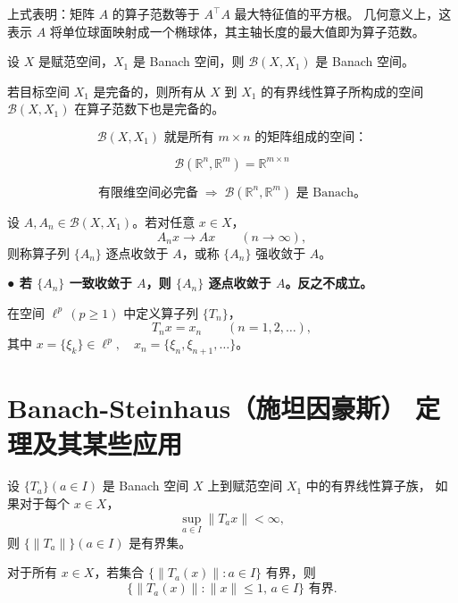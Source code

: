\begin{remark}
上式表明：矩阵 $A$ 的算子范数等于 $A^\top A$ 最大特征值的平方根。  
几何意义上，这表示 $A$ 将单位球面映射成一个椭球体，其主轴长度的最大值即为算子范数。
\end{remark}
\begin{theorem}[Banch空间和所有赋范空间组成的空间都是banch空间]
设 $X$ 是赋范空间，$X_1$ 是 Banach 空间，则 $\mathcal{B}(X, X_1)$ 是 Banach 空间。
\end{theorem}
若目标空间 $X_1$ 是完备的，则所有从 $X$ 到 $X_1$ 的有界线性算子所构成的空间 $\mathcal{B}(X,X_1)$ 在算子范数下也是完备的。
\begin{example}
    \[
\mathcal{B}(X, X_1) \text{ 就是所有 } m \times n \text{ 的矩阵组成的空间：}
\]

\[
\mathcal{B}(\mathbb{R}^n, \mathbb{R}^m) = \mathbb{R}^{m \times n}
\]

\[
\text{有限维空间必完备} \;\Rightarrow\; \mathcal{B}(\mathbb{R}^n, \mathbb{R}^m) \text{ 是 Banach。}
\]
\end{example}
\begin{definition}
设 $A, A_n \in \mathcal{B}(X, X_1)$。若对任意 $x \in X$，
\[
A_n x \to Ax \qquad (n \to \infty),
\]
则称算子列 $\{A_n\}$ 逐点收敛于 $A$，或称 $\{A_n\}$ 强收敛于 $A$。
\end{definition}
\textbf{● 若 $\{A_n\}$ 一致收敛于 $A$，则 $\{A_n\}$ 逐点收敛于 $A$。反之不成立。}

\begin{example}
在空间 $\ell^p\,(p \ge 1)$ 中定义算子列 $\{T_n\}$，
\[
T_n x = x_n \qquad (n = 1,2,\dots),
\]
其中 $x = \{\xi_k\} \in \ell^p,\quad x_n = \{\xi_n, \xi_{n+1},\dots\}$。
\end{example}
\section{Banach-Steinhaus（施坦因豪斯）
            定理及其某些应用
}
\begin{theorem}
设 $\{T_a\}(a \in I)$ 是 Banach 空间 $X$ 上到赋范空间 $X_1$ 中的有界线性算子族，
如果对于每个 $x \in X$，
\[
\sup_{a \in I} \|T_a x\| < \infty,
\]
则 $\{\|T_a\|\}(a \in I)$ 是有界集。
\end{theorem}

对于所有 $x \in X$，若集合 $\{\|T_a(x)\| : a \in I\}$ 有界，则
\[
\{\|T_a(x)\| : \|x\| \le 1, \, a \in I\} \text{ 有界}.
\]

